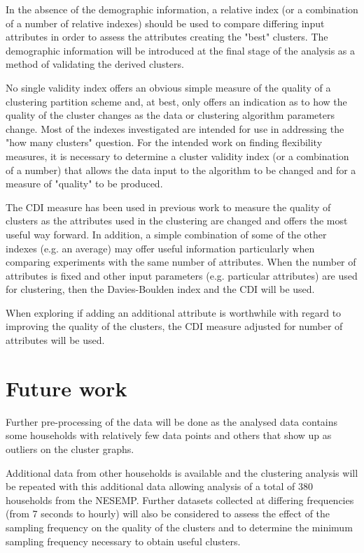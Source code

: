 \documentclass[conference]{IEEEtran}
\begin{document}
In the absence of the demographic information, a relative index (or a combination of a number of relative indexes) should be used to compare differing input attributes in order to assess the attributes creating the "best" clusters. The demographic information will be introduced at the final stage of the analysis as a method of validating the derived clusters. 

No single validity index offers an obvious simple measure of the quality of a clustering partition scheme and, at best, only offers an indication as to how the quality of the cluster changes as the data or clustering algorithm parameters change. Most of the indexes investigated are intended for use in addressing the "how many clusters" question. For the intended work on finding flexibility measures, it is necessary to determine a cluster validity index (or a combination of a number) that allows the data input to the algorithm to be changed and for a measure of "quality" to be produced.

The CDI measure has been used in previous work \cite{chicco2003customer} to measure the quality of clusters as the attributes used in the clustering are changed and offers the most useful way forward. In addition, a simple combination of some of the other indexes (e.g. an average) may offer useful information particularly when comparing experiments with the same number of attributes. When the number of attributes is fixed and other input parameters (e.g. particular attributes) are used for clustering, then the Davies-Boulden index and the CDI will be used.

When exploring if adding an additional attribute is worthwhile with regard to improving the quality of the clusters, the CDI measure adjusted for number of attributes will be used.

\section{Future work}
Further pre-processing of the data will be done as the analysed data contains some households with relatively few data points and others that show up as outliers on the cluster graphs.

Additional data from other households is available and the clustering analysis will be repeated with this additional data allowing analysis of a total of 380 households from the NESEMP. Further datasets collected at differing frequencies (from 7 seconds to hourly) will also be considered to assess the effect of the sampling frequency on the quality of the clusters and to determine the minimum sampling frequency necessary to obtain useful clusters.
\end{document}
